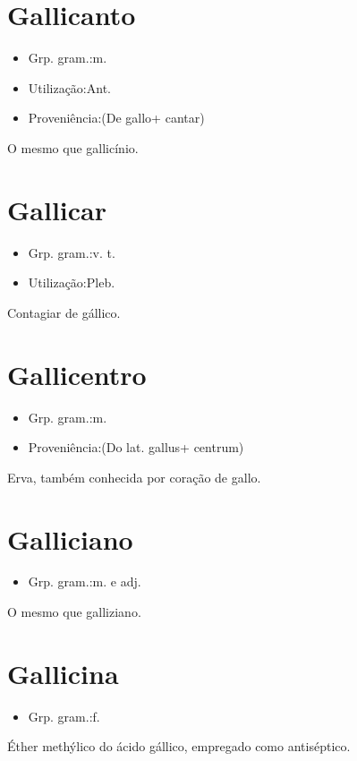 \section{Gallicanto}
\begin{itemize}
\item {Grp. gram.:m.}
\end{itemize}
\begin{itemize}
\item {Utilização:Ant.}
\end{itemize}
\begin{itemize}
\item {Proveniência:(De \textunderscore gallo\textunderscore  + \textunderscore cantar\textunderscore )}
\end{itemize}
O mesmo que \textunderscore gallicínio\textunderscore .
\section{Gallicar}
\begin{itemize}
\item {Grp. gram.:v. t.}
\end{itemize}
\begin{itemize}
\item {Utilização:Pleb.}
\end{itemize}
Contagiar de gállico.
\section{Gallicentro}
\begin{itemize}
\item {Grp. gram.:m.}
\end{itemize}
\begin{itemize}
\item {Proveniência:(Do lat. \textunderscore gallus\textunderscore  + \textunderscore centrum\textunderscore )}
\end{itemize}
Erva, também conhecida por \textunderscore coração de gallo\textunderscore .
\section{Galliciano}
\begin{itemize}
\item {Grp. gram.:m.  e  adj.}
\end{itemize}
O mesmo que \textunderscore galliziano\textunderscore .
\section{Gallicina}
\begin{itemize}
\item {Grp. gram.:f.}
\end{itemize}
Éther methýlico do ácido gállico, empregado como antiséptico.
